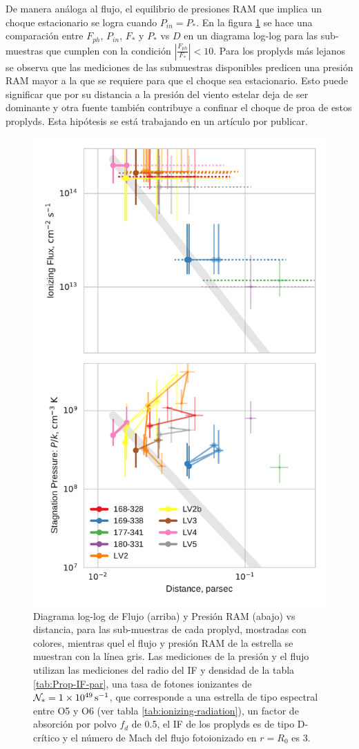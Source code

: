 De manera análoga al flujo, el equilibrio de presiones RAM que implica un choque estacionario se logra cuando $P_{in} = P_*$. En la figura \ref{fig:wind-fits} se hace una comparación entre $F_{ph}$, $P_{in}$, $F_*$ y $P_{*}$ vs $D$ en un diagrama log-log para las sub-muestras que cumplen con la condición $\left|\frac{F_{ph}}{F_*}\right| < 10$. Para los proplyds más lejanos se observa que las mediciones de las submuestras disponibles predicen una presión RAM mayor a la que se requiere para que el choque sea estacionario. Esto puede significar que por su distancia a \thC{} la presión del viento estelar deja de ser dominante y otra fuente también contribuye a confinar el choque de proa de estos proplyds. Esta hipótesis se está trabajando en un artículo por publicar.

\begin{figure}
  \includegraphics[width=0.5\linewidth]{./Figures/plot-wind-fits}
  \caption{Diagrama log-log de Flujo (arriba) y Presión RAM (abajo) vs distancia, para las sub-muestras de cada proplyd, mostradas con colores, mientras quel el flujo y presión RAM de la estrella se muestran con la línea gris. Las mediciones de la presión y el flujo utilizan las mediciones del radio del IF y densidad de la tabla \ref{tab:Prop-IF-par}, una tasa de fotones ionizantes de $\mathcal{N}_* = \SI{1e49}{s^{-1}}$, que corresponde a una estrella de tipo espectral entre O5 y O6 (ver tabla \ref{tab:ionizing-radiation}), un factor de absorción por polvo  $f_d$ de 0.5, el IF de los proplyds es de tipo D-crítico y el número de Mach del flujo fotoionizado en $r=R_0$ es 3.}
  \label{fig:wind-fits}
\end{figure}
